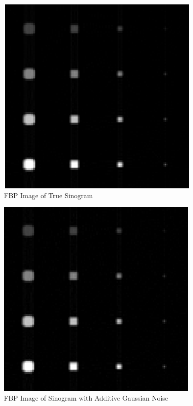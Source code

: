 \documentclass{article}
\begin{document}
\newpage
\begin{figure}[h]
\centering
  \includegraphics{FBP1.png}
  \caption{FBP Image of True Sinogram}\label{fbp1}
\end{figure}

\newpage
\begin{figure}[h]
  \includegraphics[width=\linewidth]{FBP2.png}
  \caption{FBP Image of Sinogram with Additive Gaussian Noise}\label{fbp2}
\end{figure}
\end{document}
